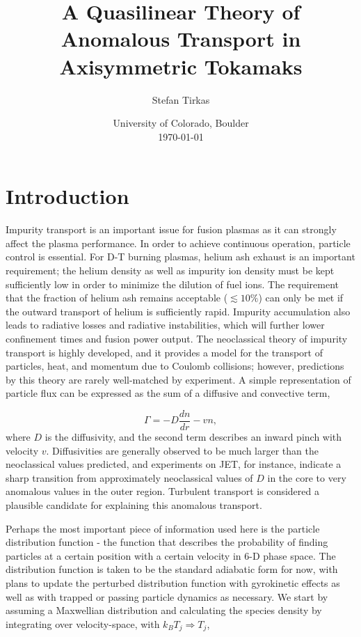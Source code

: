 \documentclass[12pt]{article}
\numberwithin{equation}{section}
\begin{document}
\title{A Quasilinear Theory of Anomalous Transport in Axisymmetric Tokamaks}
\author{Stefan Tirkas}


\date{University of Colorado, Boulder\\[2ex]%
      \today}

\maketitle


\section{Introduction}
   \quad Impurity transport is an important issue for fusion plasmas as it can strongly affect the plasma performance.
In order to achieve continuous operation, particle control is essential\cite{ITER}. For D-T burning plasmas, helium ash exhaust is
an important requirement; the helium density as well as impurity ion density must be kept sufficiently low in order to
minimize the dilution of fuel ions. The requirement that the fraction of helium ash remains acceptable ($\lesssim 10\%$) can
only be met if the outward transport of helium is sufficiently rapid\cite{WessonA}. Impurity accumulation also leads to radiative
losses and radiative instabilities, which will further lower confinement times and fusion power output. The neoclassical theory of
impurity transport is highly developed, and it provides a model for the transport of particles, heat, and momentum due to Coulomb
collisions; however, predictions by this theory are rarely well-matched by experiment. A simple representation of particle flux can
be expressed as the sum of a diffusive and convective term,

   \begin{equation}
      \Gamma = -D\frac{dn}{dr} - vn,
   \end{equation}
where $D$ is the diffusivity, and the second term describes an inward pinch with velocity $v$. Diffusivities are generally observed
to be much larger than the neoclassical values predicted, and experiments on JET, for instance, indicate a sharp transition from
approximately neoclassical values of $D$ in the core to very anomalous values in the outer region\cite{WessonB}. Turbulent transport
is considered a plausible candidate for explaining this anomalous transport.

   \quad Perhaps the most important piece of information used here is the particle distribution function - the function that describes the
probability of finding particles at a certain position with a certain velocity in 6-D phase space. The distribution function is taken to be
the standard adiabatic form for now, with plans to update the perturbed distribution function with gyrokinetic effects as well as with trapped
or passing particle dynamics as necessary. We start by assuming a Maxwellian distribution and calculating the species density by integrating over
velocity-space, with $k_B T_j \Rightarrow T_j$,
   
\end{document}
